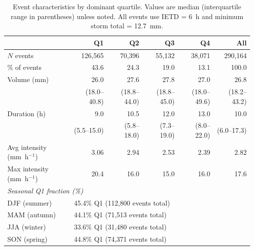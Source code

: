 \documentclass[a4paper,fleqn]{cas-sc}
\begin{document}
\begin{table}[!t]
  \centering
  \caption{Event characteristics by dominant quartile. Values are
    median (interquartile range in parentheses) unless noted.
    All events use IETD = 6~h and minimum storm total = 12.7~mm.}
  \label{tab:events}
  \begin{tabular}{lrrrrr}
    \toprule
    & Q1 & Q2 & Q3 & Q4 & All \\
    \midrule
    $N$ events      &
      126{,}565 & 70{,}396 & 55{,}132 & 38{,}071 & 290{,}164 \\
    \% of events    &
      43.6 & 24.3 & 19.0 & 13.1 & 100.0 \\
    \midrule
    Volume (mm)     &
      26.0 & 27.6 & 27.8 & 27.0 & 26.8 \\
                    &
      (18.0–40.8) & (18.8–44.0) & (18.8–45.0) & (18.0–49.6) & (18.2–43.2) \\
    Duration (h)    &
      9.0 & 10.5 & 12.0 & 13.0 & 10.0 \\
                    &
      (5.5–15.0) & (5.8–18.0) & (7.3–19.0) & (8.0–22.0) & (6.0–17.3) \\
    Avg intensity (mm~h$^{-1}$) &
      3.06 & 2.94 & 2.53 & 2.39 & 2.82 \\
    Max intensity (mm~h$^{-1}$) &
      20.4 & 16.0 & 15.0 & 16.0 & 17.6 \\
    \midrule
    \multicolumn{6}{l}{\textit{Seasonal Q1 fraction (\%)}} \\
    DJF (summer) & \multicolumn{4}{l}{45.4\% Q1 \quad (112{,}800 events total)} & \\
    MAM (autumn) & \multicolumn{4}{l}{44.1\% Q1 \quad (71{,}513 events total)} & \\
    JJA (winter) & \multicolumn{4}{l}{33.6\% Q1 \quad (31{,}480 events total)} & \\
    SON (spring) & \multicolumn{4}{l}{44.8\% Q1 \quad (74{,}371 events total)} & \\
    \bottomrule
  \end{tabular}
\end{table}
\end{document}
